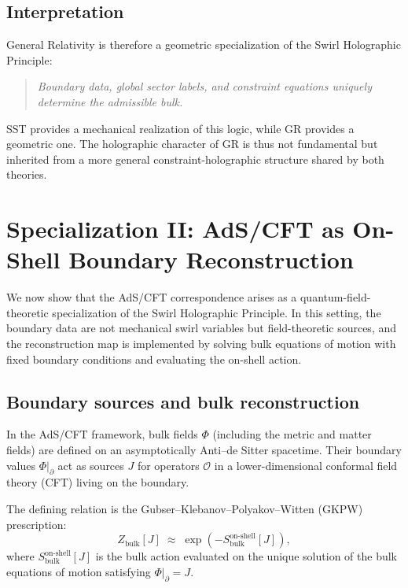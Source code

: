 \documentclass[11pt]{article}
\begin{document}
    \subsection{Interpretation}

        General Relativity is therefore a geometric specialization of the Swirl
        Holographic Principle:

        \begin{quote}
            \emph{Boundary data, global sector labels, and constraint equations uniquely
            determine the admissible bulk.}
        \end{quote}

        SST provides a mechanical realization of this logic, while GR provides a geometric
        one. The holographic character of GR is thus not fundamental but inherited from a
        more general constraint-holographic structure shared by both theories.

    \section{Specialization II: AdS/CFT as On-Shell Boundary Reconstruction}

    We now show that the AdS/CFT correspondence arises as a quantum-field-theoretic
    specialization of the Swirl Holographic Principle. In this setting, the boundary
    data are not mechanical swirl variables but field-theoretic sources, and the
    reconstruction map is implemented by solving bulk equations of motion with fixed
    boundary conditions and evaluating the on-shell action.

    \subsection{Boundary sources and bulk reconstruction}

        In the AdS/CFT framework, bulk fields $\Phi$ (including the metric and matter
        fields) are defined on an asymptotically Anti--de Sitter spacetime. Their boundary
        values $\Phi|_{\partial}$ act as sources $J$ for operators $\mathcal{O}$ in a
        lower-dimensional conformal field theory (CFT) living on the boundary.

        The defining relation is the Gubser--Klebanov--Polyakov--Witten (GKPW) prescription:
        \begin{equation}
            Z_{\mathrm{bulk}}[J]
            \;\approx\;
            \exp\!\left(-S_{\mathrm{bulk}}^{\mathrm{on\text{-}shell}}[J]\right),
        \end{equation}
        where $S_{\mathrm{bulk}}^{\mathrm{on\text{-}shell}}[J]$ is the bulk action evaluated
        on the unique solution of the bulk equations of motion satisfying
        $\Phi|_{\partial}=J$.
\end{document}
